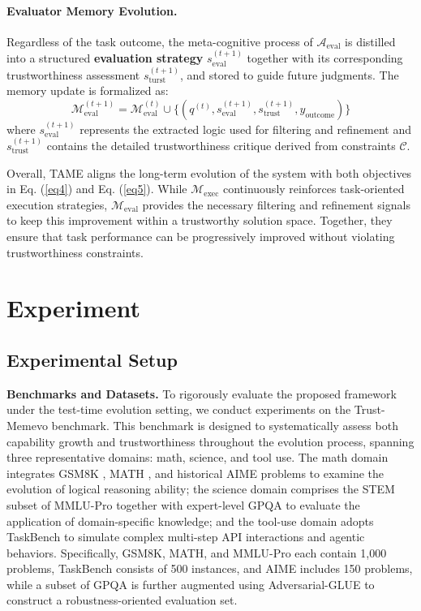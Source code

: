 \documentclass{article}
\theoremstyle{plain}
\theoremstyle{definition}
\theoremstyle{remark}
\begin{document}
\paragraph{Evaluator Memory Evolution.} Regardless of the task outcome, the meta-cognitive process of $\mathcal{A}_{\text{eval}}$ is distilled into a structured \textbf{evaluation strategy} $s_{\text{eval}}^{(t+1)}$ together with its corresponding trustworthiness assessment $s_{\text{turst}}^{(t+1)}$, and stored to guide future judgments. The memory update is formalized as:
\begin{equation}
    \mathcal{M}_{\text{eval}}^{(t+1)} = \mathcal{M}_{\text{eval}}^{(t)} \cup \big\{ (q^{(t)}, s_{\text{eval}}^{(t+1)}, s_{\text{trust}}^{(t+1)}, y_{\text{outcome}}) \big\}
\end{equation}
where $s_{\text{eval}}^{(t+1)}$ represents the extracted logic used for filtering and refinement and $s_{\text{trust}}^{(t+1)}$ contains the detailed trustworthiness critique derived from constraints $\mathcal{C}$. 

Overall, TAME aligns the long-term evolution of the system with both objectives in Eq. (\ref{eq4}) and Eq. (\ref{eq5}). While $\mathcal{M}_{\text{exec}}$ continuously reinforces task-oriented execution strategies, $\mathcal{M}_{\text{eval}}$ provides the necessary filtering and refinement signals to keep this improvement within a trustworthy solution space. Together, they ensure that task performance can be progressively improved without violating trustworthiness constraints.

\section{Experiment}

\subsection{Experimental Setup}
\label{sec:experimental_setup}

\textbf{Benchmarks and Datasets.}
To rigorously evaluate the proposed framework under the test-time evolution setting, we conduct experiments on the Trust-Memevo benchmark. This benchmark is designed to systematically assess both capability growth and trustworthiness throughout the evolution process, spanning three representative domains: math, science, and tool use. The math domain integrates GSM8K \cite{cobbe2021gsm8k}, MATH \cite{hendrycksmath2021}, and historical AIME problems to examine the evolution of logical reasoning ability; the science domain comprises the STEM subset of MMLU-Pro \cite{wang2024mmlupro} together with expert-level GPQA \cite{rein2024gpqa} to evaluate the application of domain-specific knowledge; and the tool-use domain adopts TaskBench \cite{shen2024taskbench} to simulate complex multi-step API interactions and agentic behaviors. Specifically, GSM8K, MATH, and MMLU-Pro each contain 1,000 problems, TaskBench consists of 500 instances, and AIME includes 150 problems, while a subset of GPQA is further augmented using Adversarial-GLUE \cite{wang2021adversarial} to construct a robustness-oriented evaluation set.
\end{document}
